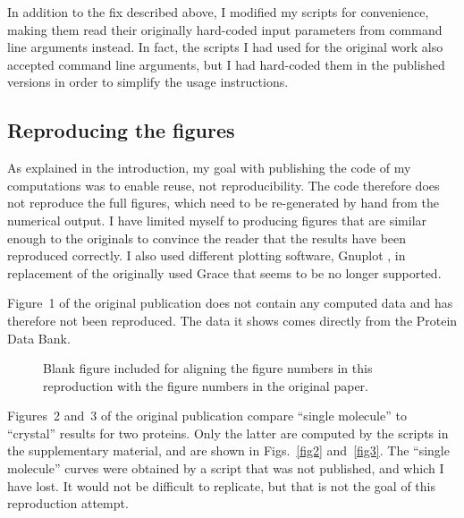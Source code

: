 In addition to the fix described above, I modified my scripts for convenience, making them read their originally hard-coded input parameters from  command line arguments instead. In fact, the scripts I had used for the original work also accepted command line arguments, but I had hard-coded them in the published versions in order to simplify the usage instructions.

\subsection*{Reproducing the figures}

As explained in the introduction, my goal with publishing the code of my computations was to enable reuse, not reproducibility. The code therefore does not reproduce the full figures, which need to be re-generated by hand from the numerical output. I have limited myself to producing figures that are similar enough to the originals to convince the reader that the results have been reproduced correctly. I also used different plotting software, Gnuplot \cite{WilliamsGnuplot2020}, in replacement of the originally used Grace \cite{GraceDevelopmentTeamGrace2008} that seems to be no longer supported.

Figure~1 of the original publication does not contain any computed data and has therefore not been reproduced. The data it shows comes directly from the Protein Data Bank.

\begin{figure}
\caption{Blank figure included for aligning the figure numbers in this reproduction with the figure numbers in the original paper.}
\label{fig1}
\end{figure}

Figures~2 and~3 of the original publication compare ``single molecule'' to ``crystal'' results for two proteins. Only the latter are computed by the scripts in the supplementary material, and are shown in Figs.~\ref{fig2} and~\ref{fig3}. The ``single molecule'' curves were obtained by a script that was not published, and which I have lost. It would not be difficult to replicate, but that is not the goal of this reproduction attempt.

